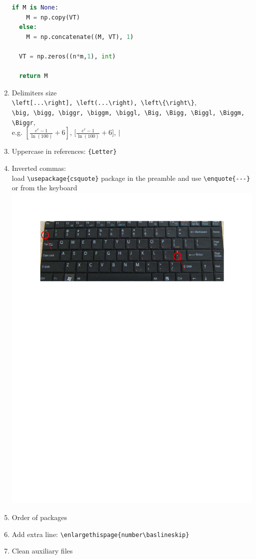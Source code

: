 \documentclass[12pt,a4paper]{report}
\begin{document}
\begin{enumerate}
\begin{lstlisting}[language=Python]
  if M is None:
    M = np.copy(VT)
  else:
    M = np.concatenate((M, VT), 1)
  
  VT = np.zeros((n*m,1), int)
  
  return M
\end{lstlisting}


 
\item Delimiters size\\
\verb|\left[...\right], \left(...\right), \left\{\right\}|,\\
\verb|\big, \bigg, \biggr, \biggm, \biggl, \Big, \Bigg, \Biggl, \Biggm, \Biggr|,\\
e.g. $\left[\frac{e^e - 1}{\ln(100)} + 6\right]$,
$\Big[\frac{e^e - 1}{\ln(100)} + 6\Big]$, $\Big\vert$
\item Uppercase in references: \verb|{Letter}|
\item Inverted commas:\\
load \verb|\usepackage{csquote}|  package in the preamble and use \verb|\enquote{---}|\\ 
 or from the keyboard\\
{\centering
\includegraphics[width=1\textwidth]{keyboard}}
\item Order of packages
\item Add extra line:
\verb|\enlargethispage{number\baslineskip}| 
\item Clean auxiliary files
\end{enumerate}
\end{document}
